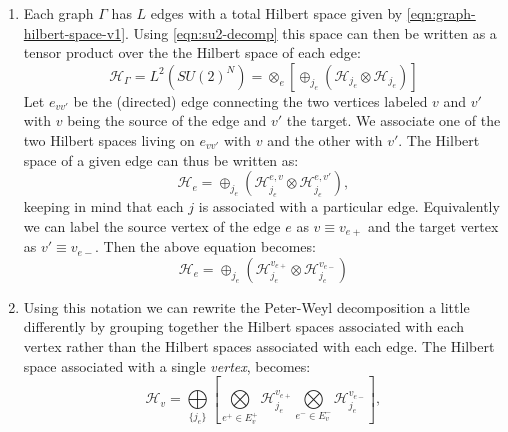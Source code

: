 \documentclass[preprint]{SciPost}
\newcommand{\mc}[1]{\mathcal{#1}}
\theoremstyle{plain} %
\begin{document}
\begin{enumerate}[label=\arabic*.]
		Each such matrix can therefore also be viewed as an element of $ \mc{H}_j \otimes \mc{H}_j $. Consequently the space $ L^2(G) $ can be decomposed as a direct sum over all possible representations of $ SU(2) $:
		\begin{equation}\label{eqn:su2-decomp}
		L^2(G) = \oplus_j (\mc{H}_j \otimes \mc{H}_j)
		\end{equation}
		\textbf{Note:} this implies that with each edge there are associated \emph{two} copies of the Hilbert space of a spin $ j $ particle. This fact will be crucial going forwards.
		\item Each graph $ \Gamma $ has $ L $ edges with a total Hilbert space given by \eqref{eqn:graph-hilbert-space-v1}. Using \eqref{eqn:su2-decomp} this space can then be written as a tensor product over the the Hilbert space of each edge:
		\begin{equation}\label{eqn:graph-hilbert-space-v2}
		\mc{H}_\Gamma = L^2(SU(2)^N) = \otimes_e \left[ \oplus_{j_e} (\mc{H}_{j_e} \otimes \mc{H}_{j_e} )\right]
		\end{equation}
		Let $ e_{vv'} $ be the (directed) edge connecting the two vertices labeled $ v $ and $ v' $ with $ v $ being the source of the edge and $ v' $ the target. We associate one of the two Hilbert spaces living on $ e_{vv'} $ with $ v $ and the other with $ v' $. The Hilbert space of a given edge can thus be written as:
		\begin{equation}\label{eqn:edge-hilbert-space-v1}
		\mc{H}_{e} = \oplus_{j_e} (\mc{H}^{e,v}_{j_e} \otimes \mc{H}^{e,v'}_{j_e}),
		\end{equation}
		keeping in mind that each $ j $ is associated with a particular edge.
		Equivalently we can label the source vertex of the edge $ e $ as $ v \equiv v_{e+} $ and the target vertex as $ v' \equiv v_{e-} $. Then the above equation becomes:
		\begin{equation}\label{eqn:edge-hilbert-space-v2}
		\mc{H}_{e} = \oplus_{j_e} (\mc{H}^{v_{e+}}_{j_e} \otimes \mc{H}^{v_{e-}}_{j_e})
		\end{equation}
		\item Using this notation we can rewrite the Peter-Weyl decomposition a little differently by grouping together the Hilbert spaces associated with each vertex rather than the Hilbert spaces associated with each edge. The Hilbert space associated with a single \emph{vertex}, becomes:
		\begin{equation}\label{eqn:vertex-hilbert-space}
		\mc{H}_v = \underset{\{j_e\}}{\bigoplus} \left[ \underset{{e^+\in E^+_v}}{\bigotimes} \mc{H}^{v_{e+}}_{j_e} \underset{{e^-\in E^-_v}}{\bigotimes} \mc{H}^{v_{e-}}_{j_e} \right],

\end{equation}
\end{enumerate}
\end{document}
